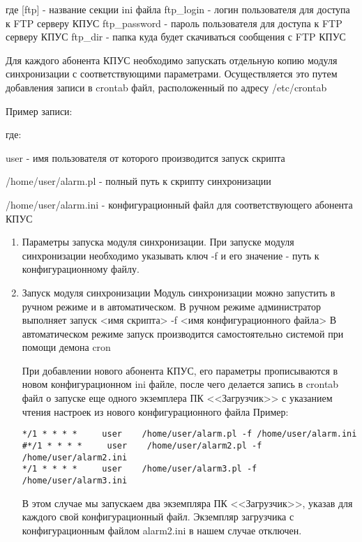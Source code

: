 \documentclass[12pt]{article}[a4paper,14pt,russian]
\begin{document}
где
[ftp] - название секции ini файла
ftp\_login - логин пользователя для доступа к FTP серверу КПУС
ftp\_password - пароль пользователя для доступа к FTP серверу КПУС
ftp\_dir - папка куда будет  скачиваться сообщения с FTP КПУС

Для каждого абонента КПУС необходимо запускать отдельную копию модуля синхронизации с соответствующими параметрами. Осуществляется это путем добавления записи в crontab файл, расположенный по адресу /etc/crontab

Пример записи:

	
	где:
	
user - имя пользователя от которого производится запуск скрипта


/home/user/alarm.pl - полный путь к скрипту синхронизации

/home/user/alarm.ini - конфигурационный файл для соответствующего абонента КПУС

\begin{enumerate}
\item Параметры запуска модуля синхронизации.
При запуске модуля синхронизации необходимо указывать ключ -f и его значение - путь к конфигурационному файлу.
\item Запуск модуля синхронизации
Модуль синхронизации можно запустить в ручном режиме и в автоматическом. В ручном режиме администратор выполняет запуск 
<имя скрипта> -f <имя конфигурационного файла>
В автоматическом режиме запуск производится самостоятельно системой при помощи демона cron

При добавлении нового абонента КПУС, его параметры прописываются в новом конфигурационном ini файле, после чего делается запись в crontab файл о запуске еще одного экземплера ПК <<Загрузчик>>  с указанием чтения настроек из нового конфигурационного файла
Пример:
\begin{verbatim}
*/1 * * * *     user    /home/user/alarm.pl -f /home/user/alarm.ini
#*/1 * * * *     user    /home/user/alarm2.pl -f /home/user/alarm2.ini
*/1 * * * *     user    /home/user/alarm3.pl -f /home/user/alarm3.ini

\end{verbatim}
В этом случае мы запускаем два экземпляра ПК <<Загрузчик>>, указав для каждого свой конфигурационный файл. Экземпляр загрузчика с конфигурационным файлом alarm2.ini в нашем случае отключен.
\end{enumerate}
\end{document}
